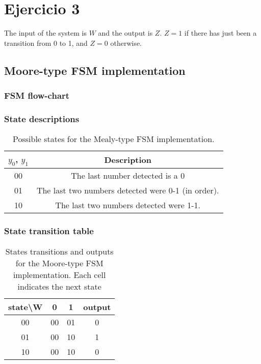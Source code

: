 \documentclass[../../e3_tp3_main.tex]{subfiles}
\begin{document}
\chapter{Ejercicio 3}


The input of the system is $W$ and the output is $Z$. $Z=1$ if there has just been a transition from 0 to 1, and $Z=0$ otherwise.

\section{Moore-type FSM implementation}
\subsection{FSM flow-chart}

\subsection{State descriptions}
\begin{table}[H]	%
	\centering
	\begin{tabular}{|c|c|}
	\hline	
	$y_0$, $y_1$  & Description\\	
	\hline 
	00 & The last number detected is a 0\\ 
	\hline 
	01 & The last two numbers detected were 0-1 (in order).\\ 
	\hline 
	10 & The last two numbers detected were 1-1.\\ 
	\hline
	
	\end{tabular} 
	\caption{Possible states for the Mealy-type FSM implementation.}
	\label{tab:ej3_moore_states}
\end{table}


\subsection{State transition table}
\begin{table}[H]	%
	\centering
		\begin{tabular}{|c|c|c|c|}
		\hline 
		state\textbackslash W & 0 & 1 & output\\ 
		\hline 
		00 & 00 & 01 & 0\\ 
		\hline 
		01 & 00 & 10 & 1\\ 
		\hline 
		10 & 00 & 10 & 0\\ 
		\hline 
		\end{tabular} 
	\caption[States transitions and outputs for the Moore-type FSM implementation]{States transitions and outputs for the Moore-type FSM implementation. Each cell indicates the next state}
	\label{tab:ej3_moore_transitions}
\end{table}
\end{document}
